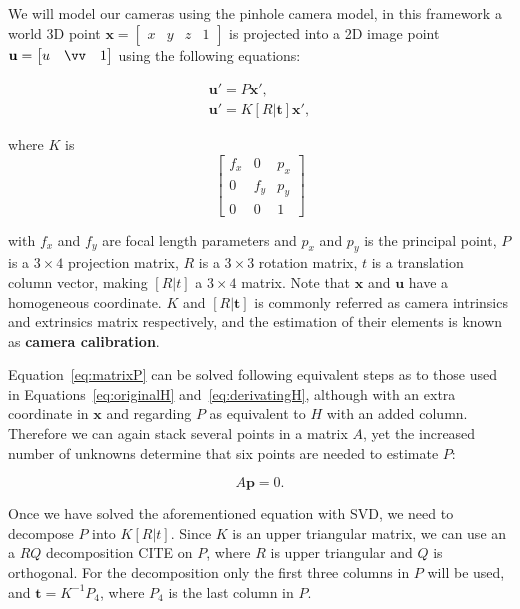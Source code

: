 \documentclass[12pt]{article}
\begin{document}
We will model our cameras using the pinhole camera model, in this framework a world 3D point $\mathbf{x} = \begin{bmatrix} x & y & z & 1 \end{bmatrix}$ is projected into a 2D image point $\mathbf{u} = \begin{bmatrix} u & \vv & 1 \end{bmatrix}$ using the following equations:

\begin{gather}
	\mathbf{u}' = P \mathbf{x}', \label{eq:matrixP} \\
	\mathbf{u}' = K [R | \mathbf{t}] \mathbf{x}', \label{eq:matrixRT}
\end{gather}

where $K$ is 
\begin{equation}
\begin{bmatrix}
f_x & 0 & p_x \\ 
0 & f_y & p_y \\ 
0 & 0 & 1
\end{bmatrix}
\end{equation}

with $f_x$ and $f_y$ are focal length parameters and $p_x$ and $p_y$ is the principal point, $P$ is a $3 \times 4$ projection matrix, $R$ is a $3 \times 3$ rotation matrix, $t$ is a translation column vector, making $[R|t]$ a $3 \times 4$ matrix.
Note that $\mathbf{x}$ and $\mathbf{u}$ have a homogeneous coordinate.
$K$ and $[R|\mathbf{t}]$ is commonly referred as camera intrinsics and extrinsics matrix respectively, and the estimation of their elements is known as \textbf{camera calibration}.

Equation~\ref{eq:matrixP} can be solved following equivalent steps as to those used in Equations~\ref{eq:originalH} and~\ref{eq:derivatingH}, although with an extra coordinate in $\mathbf{x}$ and regarding $P$ as equivalent to $H$ with an added column.
Therefore we can again stack several points in a matrix $A$, yet the increased number of unknowns determine that six points are needed to estimate $P$:

\begin{equation}
A\mathbf{p} = 0.
\end{equation}

Once we have solved the aforementioned equation with SVD, we need to decompose $P$ into $K[R|t]$.
Since $K$ is an upper triangular matrix, we can use an a $RQ$ decomposition CITE on $P$, where $R$ is upper triangular and $Q$ is orthogonal.
For the decomposition only the first three columns in $P$ will be used, and $\mathbf{t} = K^{-1}P_4$, where $P_4$ is the last column in $P$.
\end{document}
